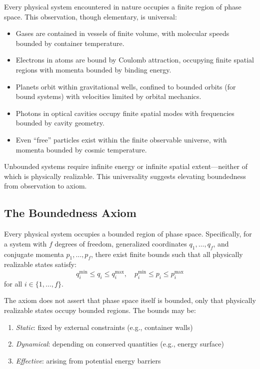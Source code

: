 Every physical system encountered in nature occupies a finite region of phase space. This observation, though elementary, is universal:

\begin{itemize}
    \item Gases are contained in vessels of finite volume, with molecular speeds bounded by container temperature.
    \item Electrons in atoms are bound by Coulomb attraction, occupying finite spatial regions with momenta bounded by binding energy.
    \item Planets orbit within gravitational wells, confined to bounded orbits (for bound systems) with velocities limited by orbital mechanics.
    \item Photons in optical cavities occupy finite spatial modes with frequencies bounded by cavity geometry.
    \item Even ``free'' particles exist within the finite observable universe, with momenta bounded by cosmic temperature.
\end{itemize}

Unbounded systems require infinite energy or infinite spatial extent---neither of which is physically realizable. This universality suggests elevating boundedness from observation to axiom.

\subsection{The Boundedness Axiom}

\begin{axiom}[Boundedness]
\label{axiom:boundedness}
Every physical system occupies a bounded region of phase space. Specifically, for a system with $f$ degrees of freedom, generalized coordinates $q_1, \ldots, q_f$, and conjugate momenta $p_1, \ldots, p_f$, there exist finite bounds such that all physically realizable states satisfy:
\begin{equation}
q_i^{\min} \leq q_i \leq q_i^{\max}, \quad p_i^{\min} \leq p_i \leq p_i^{\max}
\end{equation}
for all $i \in \{1, \ldots, f\}$.
\end{axiom}

\begin{remark}
The axiom does not assert that phase space itself is bounded, only that physically realizable states occupy bounded regions. The bounds may be:
\begin{enumerate}
    \item \textit{Static}: fixed by external constraints (e.g., container walls)
    \item \textit{Dynamical}: depending on conserved quantities (e.g., energy surface)
    \item \textit{Effective}: arising from potential energy barriers
\end{enumerate}
\end{remark}

